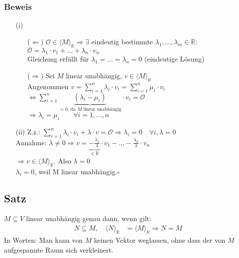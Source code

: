 \documentclass[12pt,titlepage, pdf]{article}
\newcommand{\R}{\mathds{R}}
\newcommand{\vecspace}[2]{\langle#1\rangle_{#2}}
\newcommand{\vecspaceR}[1]{\vecspace{#1}{\R}}
\renewcommand{\>}{\rightarrow}
\renewcommand{\*}{\cdot}
\begin{document}
\subsubsection*{Beweis}
\begin{itemize}
	\item[(i)] 
	      \begin{itemize}
	      	\item[($\Leftarrow$)] $ \mathcal{O} \in \vecspaceR{M} \Rightarrow \exists$ eindeutig bestimmte $\lambda_1, ... , \lambda_m \in \R:$\\
	      	      \noindent\hspace*{23mm}$\mathcal{O} = \lambda_1 \cdot v_1 + ... + \lambda_n \cdot v_n$ \\
	      	      Gleichung erfüllt für $\lambda_1 = ... = \lambda_n = 0$ (eindeutige Lösung)
	      	\item[($\Rightarrow$)] Sei $M$ linear unabhängig, $v \in \vecspaceR{M}$\\
	      	      Angenommen $v = \sum_{i = 1}^{n} \lambda_i \cdot v_i = \sum_{i = 1}^{n} \mu_i \cdot v_i $\\
	      	      \noindent\hspace*{25mm}$\Leftrightarrow  \sum_{i=1}^{n} \underbrace{(\lambda_i - \mu_i)}_{=0\textrm{, da }M\textrm{ linear unabhängig}} \cdot v_i = \mathcal{O}$\\
	      	      \noindent\hspace*{25mm}$\Rightarrow \lambda_i = \mu_i \qquad \forall i = 1,...,n$
	      \end{itemize}
	\item[(ii)] Z.z.: $\sum_{i=1}^{n} \lambda_i \cdot v_i + \lambda \cdot v = \mathcal{O} \Rightarrow \lambda_i = 0 \quad\forall i, \lambda = 0$ \\
	      Annahme: $\lambda \neq 0 \Rightarrow v = \underbrace{-\frac{\lambda_1}{\lambda}}_{\in\R} \cdot v_1 - ... - \frac{\lambda_n}{\lambda} \cdot v_n $\\
	      \noindent\hspace*{29mm}$\Rightarrow v \in \vecspaceR{M}$\Lightning. Also $\lambda = 0$ \\
	      $\lambda_i = 0$, weil M linear unabhängig.\hfill$\square$
\end{itemize}
\subsection{Satz}
\label{1.17}
$M \subseteq V$ linear unabhängig genau dann, wenn gilt:
\begin{align*}
	N \subseteq M,\quad \vecspaceR{N} & = \vecspaceR{M} \Rightarrow N = M 
\end{align*}
In Worten: Man kann von $M$ keinen Vektor weglassen, ohne dass der von $M$ aufgespannte Raum sich verkleinert.  \\
\end{document}
